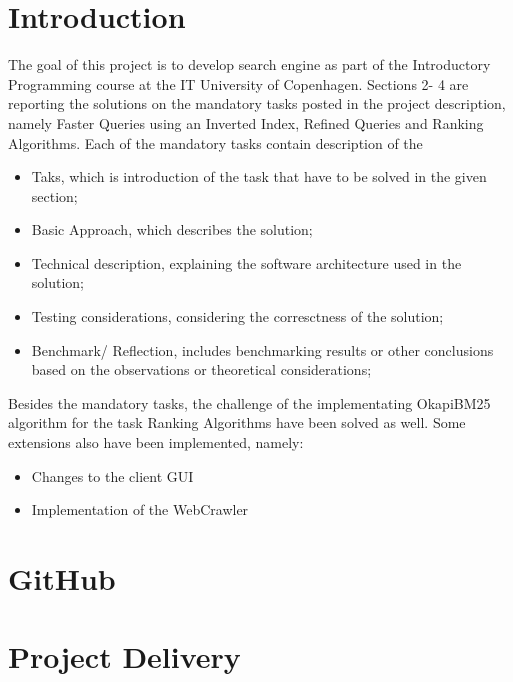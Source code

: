 \section{Introduction}
\label{sec:Introduction}
The goal of this project is to develop search engine as part of the Introductory Programming course at the IT University of Copenhagen. Sections 2- 4 are reporting the solutions on the mandatory tasks posted in the project description, namely Faster Queries using an Inverted Index, Refined Queries and Ranking Algorithms. Each of the mandatory tasks contain description of the\\ 

\begin{itemize}
\item Taks, which is introduction of the task that have to be solved in the given section;
\item Basic Approach, which describes the solution;
\item Technical description, explaining the software architecture used in the solution;
\item Testing considerations, considering the corresctness of the solution;
\item  Benchmark/ Reflection, includes benchmarking results or other conclusions based on the observations or theoretical considerations;
\end{itemize}

Besides the mandatory tasks, the challenge of the implementating OkapiBM25 algorithm for the task Ranking Algorithms have been solved as well. Some extensions also have been implemented, namely:
\begin{itemize}
    \item Changes to the client GUI
    \item Implementation of the WebCrawler
\end{itemize}

\section{GitHub}
\label{sec:GitHub}

\section{Project Delivery}
\label{sec:Project Delivery}

